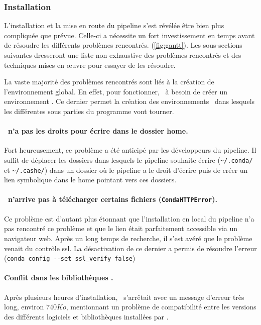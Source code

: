 \documentclass[../main]{subfiles} %
\begin{document}
\subsubsection{Installation}
L’installation et la mise en route du pipeline s'est révélée être bien plus compliquée que prévue. Celle-ci a nécessite un fort investissement en temps avant de résoudre les différents problèmes rencontrés. (\cref{fig:gantt}). Les sous-sections suivantes dresseront une liste non exhaustive des problèmes rencontrés et des techniques mises en œuvre pour essayer de les résoudre.

La vaste majorité des problèmes rencontrés sont liés à la création de l’environnement global. En effet, pour fonctionner, \GeCKO à besoin de créer un environnement \Conda. Ce dernier permet la création des environnements \SnakeMake dans lesquels les différentes sous parties du programme vont tourner. 

\paragraph{\Slurm n’a pas les droits pour écrire dans le dossier home.} Fort heureusement, ce problème a été anticipé par les développeurs du pipeline. Il suffit de déplacer les dossiers dans lesquels le pipeline souhaite écrire (\lstinline{~/.conda/} et \lstinline{~/.cashe/}) dans un dossier où le pipeline a le droit d’écrire puis de créer un lien symbolique dans le home pointant vers ces dossiers.

\paragraph{\Conda n’arrive pas à télécharger certains fichiers (\lstinline{CondaHTTPError}).} Ce problème est d’autant plus étonnant que l’installation en local du pipeline n’a pas rencontré ce problème et que le lien était parfaitement accessible via un navigateur web. Après un long temps de recherche, il s’est avéré que le problème venait du contrôle ssl. La désactivation de ce dernier a permis de résoudre l’erreur (\lstinline{conda config --set ssl_verify false})

\paragraph{Conflit dans les bibliothèques \Conda.} Après plusieurs heures d’installation, \Conda s’arrêtait avec un message d’erreur très long, environ $\num{740} Ko$, mentionnant un problème de compatibilité entre les versions des différents logiciels et bibliothèques installées par \Conda.
\end{document}

